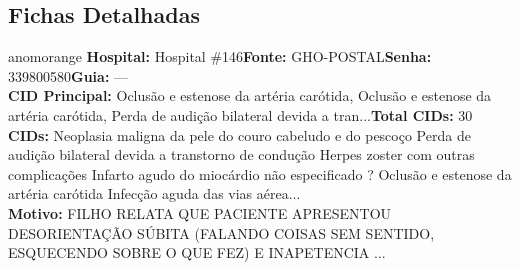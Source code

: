 \documentclass[a4paper,10pt]{article}
\begin{document}
\subsection{Fichas Detalhadas}
\begin{anomalycard}[Interna\c{c}\~{a}o \#11960 | Pac. \#12523 | ALTO (z=4.44) | LOS: 8d | 02/03/2026\,$\to$\,10/03/2026]{anomorange}
\textbf{Hospital:} Hospital \#146\quad \textbf{Fonte:} GHO-POSTAL\quad \textbf{Senha:} 339800580\quad \textbf{Guia:} ---\\

\textbf{CID Principal:} {\small Oclusão e estenose da artéria carótida, Oclusão e estenose da artéria carótida, Perda de audição bilateral devida a tran...}\quad\textbf{Total CIDs:} 30\\

\textbf{CIDs:} {\scriptsize Neoplasia maligna da pele do couro cabeludo e do pescoço \textbar{} Perda de audição bilateral devida a transtorno de condução \textbar{} Herpes zoster com outras complicações \textbar{} Infarto agudo do miocárdio não especificado \textbar{} ? \textbar{} Oclusão e estenose da artéria carótida \textbar{} Infecção aguda das vias aérea...}\\

\textbf{Motivo:} {\scriptsize FILHO RELATA QUE PACIENTE APRESENTOU DESORIENTAÇÃO SÚBITA (FALANDO COISAS SEM SENTIDO, ESQUECENDO SOBRE O QUE FEZ) E INAPETENCIA ...}\\

\end{anomalycard}
\end{document}
